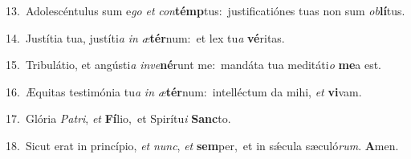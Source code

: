 {\numbfont\textcolor{\numbcolor}{13.}}~Adolescéntulus sum e\textit{go} \textit{et} \textit{con}\-\textbf{témp}tus:~\star justificatiónes tuas non sum \textit{ob}\-\textbf{lí}tus.\par
{\numbfont\textcolor{\numbcolor}{14.}}~Justítia tua, justíti\textit{a} \textit{in} \textit{æ}\-\textbf{tér}num:~\star et lex tu\textit{a} \textbf{vé}\-ritas.\par
{\numbfont\textcolor{\numbcolor}{15.}}~Tribulátio, et angústi\textit{a} \textit{in}\-\textit{ve}\textbf{né}runt me:~\star mandáta tua meditáti\textit{o} \textbf{me}\-a est.\par
{\numbfont\textcolor{\numbcolor}{16.}}~Æquitas testimónia tu\textit{a} \textit{in} \textit{æ}\-\textbf{tér}num:~\star intelléctum da mihi, \textit{et} \textbf{vi}\-vam.\par
{\numbfont\textcolor{\numbcolor}{17.}}~Glória \textit{Pa}\-\textit{tri}, \textit{et} \textbf{Fí}\-lio,~\star et Spirítu\textit{i} \textbf{Sanc}\-to.\par
{\numbfont\textcolor{\numbcolor}{18.}}~Sicut erat in princípio, \textit{et} \textit{nunc}\-, \textit{et} \textbf{sem}\-per,~\star et in sǽcula sæculó\-\textit{rum}\-. \textbf{A}\-men.\par
